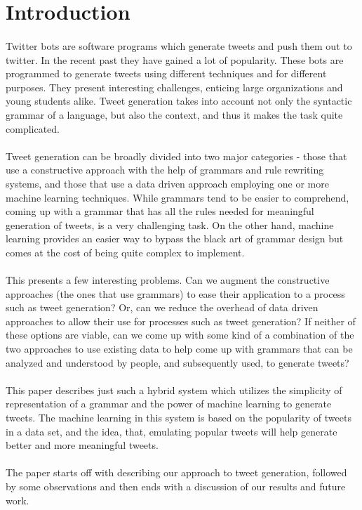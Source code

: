 \section{Introduction}
\paragraph{}
Twitter bots are software programs which generate tweets and push them out to twitter. In the recent past they have gained a lot of popularity. These bots are programmed to generate tweets using different techniques and for different purposes. They present interesting challenges, enticing large organizations and young students alike. Tweet generation takes into account not only the syntactic grammar of a language, but also the context, and thus it makes the task quite complicated.
\paragraph{}
Tweet generation can be broadly divided into two major categories - those that use a constructive approach with the help of grammars and rule rewriting systems, and those that use a data driven approach employing one or more machine learning techniques. While grammars tend to be easier to comprehend, coming up with a grammar that has all the rules needed for meaningful generation of tweets, is a very challenging task. On the other hand, machine learning provides an easier way to bypass the black art of grammar design but comes at the cost of being quite complex to implement.
\paragraph{}
This presents a few interesting problems. Can we augment the constructive approaches (the ones that use grammars) to ease their application to a process such as tweet generation? Or, can we reduce the overhead of data driven approaches to allow their use for processes such as tweet generation? If neither of these options are viable, can we come up with some kind of a combination of the two approaches to use existing data to help come up with grammars that can be analyzed and understood by people, and subsequently used, to generate tweets? 
\paragraph{}
This paper describes just such a hybrid system which utilizes the simplicity of representation of a grammar and the power of machine learning to generate tweets. The machine learning in this system is based on the popularity of tweets in a data set, and the idea, that, emulating popular tweets will help generate better and more meaningful tweets.
\paragraph{}
The paper starts off with describing our approach to tweet generation, followed by some observations and then ends with a discussion of our results and future work.